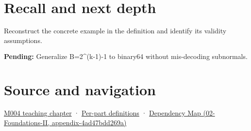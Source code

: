 \section{Recall and next depth}\label{appendix-2fae058c82e1-recall-and-next-depth}

Reconstruct the concrete example in the definition and identify its validity assumptions.

\textbf{Pending:} Generalize B=2\^{}(k-1)-1 to binary64 without mis-decoding subnormals.

\section{Source and navigation}\label{appendix-2fae058c82e1-source-and-navigation}

\href{Continuous\%20Notes/Computing\%20Foundations\%20-\%20From\%20Bits\%20to\%20C++\%20and\%20Systems\%20APIs\#A\%20stretching\%20ruler\%20for\%20real-valued\%20quantities}{M004 teaching chapter} · \hyperref[appendix-fd090d982a15-m004---parts-61-76]{Per-part definitions} · \href{../02-Foundations-II/main.pdf\#nameddest=appendix-4ad47bdd269a}{Dependency Map (02-Foundations-II, appendix-4ad47bdd269a)}
